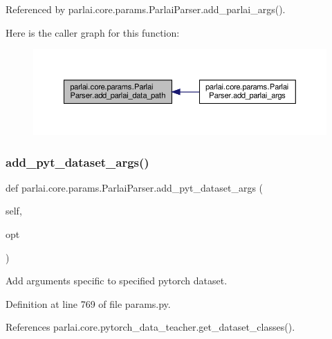 Referenced by parlai.\+core.\+params.\+Parlai\+Parser.\+add\+\_\+parlai\+\_\+args().

Here is the caller graph for this function\+:
\nopagebreak
\begin{figure}[H]
\begin{center}
\leavevmode
\includegraphics[width=350pt]{classparlai_1_1core_1_1params_1_1ParlaiParser_a896033a34a5e5e1bbc081d99e9835d6b_icgraph}
\end{center}
\end{figure}
\mbox{\label{classparlai_1_1core_1_1params_1_1ParlaiParser_a7d85a5e2fac2c1e8f0f75a4255850b9b}} 
\subsubsection{\texorpdfstring{add\+\_\+pyt\+\_\+dataset\+\_\+args()}{add\_pyt\_dataset\_args()}}
{\footnotesize\ttfamily def parlai.\+core.\+params.\+Parlai\+Parser.\+add\+\_\+pyt\+\_\+dataset\+\_\+args (\begin{DoxyParamCaption}\item[{}]{self,  }\item[{}]{opt }\end{DoxyParamCaption})}

\begin{DoxyVerb}Add arguments specific to specified pytorch dataset.\end{DoxyVerb}
 

Definition at line 769 of file params.\+py.



References parlai.\+core.\+pytorch\+\_\+data\+\_\+teacher.\+get\+\_\+dataset\+\_\+classes().



